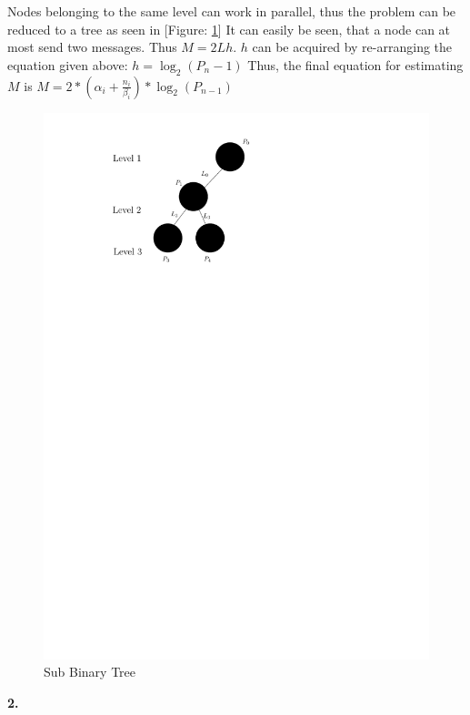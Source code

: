 \documentclass[a4paper,twoside,11pt]{article}
\begin{document}
Nodes belonging to the same level can work in parallel, thus the problem can be reduced to a tree as seen in [Figure: \ref{SubBinTree}]
It can easily be seen, that a node can at most send two messages. Thus $M = 2Lh$.
$h$ can be acquired by re-arranging the equation given above: $h=\log_2 (P_n-1)$
Thus, the final equation for estimating $M$ is $M= 2*(\alpha_i + \frac{n_i}{\beta_i}) * \log_2 (P_{n-1})$


\begin{figure}[!htbp]
    \begin{center}
        \includegraphics[scale=1]{3c_2.pdf}
    \end{center}
    \caption{Sub Binary Tree}
    \label{SubBinTree}
\end{figure}

\textbf{2.}
\end{document}
